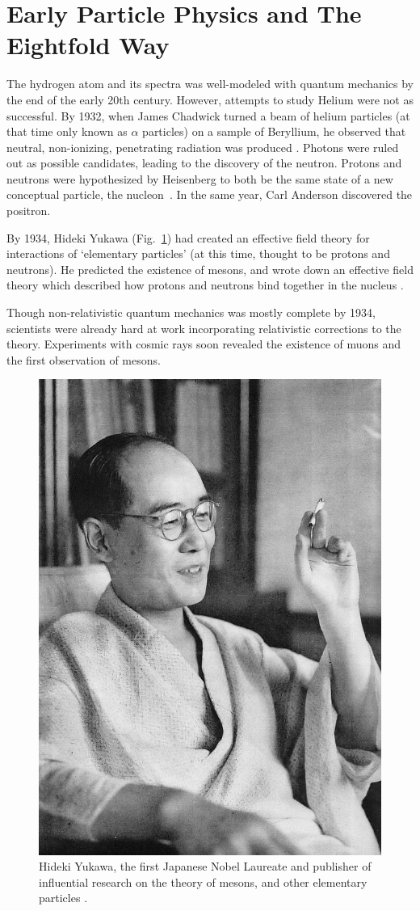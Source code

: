 \clearpage
\section{Early Particle Physics and The Eightfold Way}

The hydrogen atom and its spectra was well-modeled with quantum mechanics by the
end of the early 20th century. However, attempts to study Helium were not as
successful. By 1932, when James Chadwick turned a beam of helium particles (at
that time only known as $\alpha$ particles) on a sample of Beryllium, he
observed that neutral, non-ionizing, penetrating radiation was produced
\cite{Krauss2015}.  Photons were ruled out as possible candidates, leading to
the discovery of the neutron. Protons and neutrons were hypothesized by
Heisenberg to both be the same state of a new conceptual particle, the
nucleon~\cite{Heisenberg1952}. In the same year, Carl Anderson discovered the
positron. 

By 1934, Hideki Yukawa (Fig.~\ref{fig:hidekiyukawa}) had created an effective
field theory for interactions of `elementary particles' (at this time, thought
to be protons and neutrons). He predicted the existence of mesons, and wrote
down an effective field theory which described how protons and neutrons bind
together in the nucleus \cite{Yukawa1935}. 

Though non-relativistic quantum mechanics was mostly complete by 1934,
scientists were already hard at work incorporating relativistic corrections to
the theory. Experiments with cosmic rays soon revealed the existence of muons
and the first observation of mesons.

\begin{figure}[ht]
	\begin{center}
		\includegraphics[width=0.5\linewidth]{./figures/hidekiyukawa.jpg}
		\caption{
			Hideki Yukawa, the first Japanese Nobel Laureate and publisher of
			influential research on the theory of mesons, and other elementary
			particles  \cite{YukawaPhoto1952}.
		}
		\label{fig:hidekiyukawa}
	\end{center}
\end{figure}

